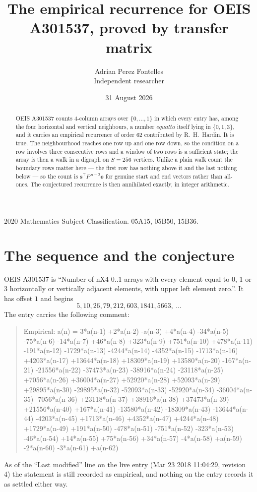 \documentclass[11pt,a4paper]{article}
\title{The empirical recurrence for OEIS A301537, proved by transfer matrix}
\author{Adrian Perez Fontelles\\ \small Independent researcher}
\date{31 August 2026}
\theoremstyle{plain}
\theoremstyle{definition}
\begin{document}
\maketitle

\begin{abstract}
OEIS A301537 counts $4$-column arrays over $\{0,\dots,1\}$ in which every entry has,
among the four horizontal and vertical neighbours, a number $equal to$ itself lying in $\{0,1,3\}$, and it carries an empirical
recurrence of order $62$ contributed by R.~H.~Hardin. It is true. The neighbourhood
reaches one row up and one row down, so the condition on a row involves three consecutive
rows and a window of two rows is a sufficient state; the array is then a walk in a digraph
on $S=256$ vertices. Unlike a plain walk count the boundary rows matter here --- the first
row has nothing above it and the last nothing below --- so the count is
$\mathbf{s}^{\!\top}P^{\,n-2}\mathbf{e}$ for genuine start and end vectors rather than
all-ones. The conjectured recurrence is then annihilated exactly, in integer arithmetic.
\end{abstract}

\noindent\small 2020 Mathematics Subject Classification. 05A15, 05B50, 15B36.\normalsize

\section{The sequence and the conjecture}

OEIS A301537 is ``Number of nX4 0..1 arrays with every element equal to 0, 1 or 3 horizontally or vertically adjacent elements, with upper left element zero.''. It has offset
$1$ and begins
\[
5, 10, 26, 79, 212, 603, 1841, 5663,\ \dots
\]
The entry carries the following comment:
\begin{quote}\small
Empirical: a(n) = 3*a(n-1) +2*a(n-2) -a(n-3) +4*a(n-4) -34*a(n-5) -75*a(n-6) -14*a(n-7) +46*a(n-8) +323*a(n-9) +751*a(n-10) +478*a(n-11) -191*a(n-12) -1729*a(n-13) -4244*a(n-14) -4352*a(n-15) -1713*a(n-16) +4203*a(n-17) +13644*a(n-18) +18309*a(n-19) +13580*a(n-20) -167*a(n-21) -21556*a(n-22) -37473*a(n-23) -38916*a(n-24) -23118*a(n-25) +7056*a(n-26) +36004*a(n-27) +52920*a(n-28) +52093*a(n-29) +29895*a(n-30) -29895*a(n-32) -52093*a(n-33) -52920*a(n-34) -36004*a(n-35) -7056*a(n-36) +23118*a(n-37) +38916*a(n-38) +37473*a(n-39) +21556*a(n-40) +167*a(n-41) -13580*a(n-42) -18309*a(n-43) -13644*a(n-44) -4203*a(n-45) +1713*a(n-46) +4352*a(n-47) +4244*a(n-48) +1729*a(n-49) +191*a(n-50) -478*a(n-51) -751*a(n-52) -323*a(n-53) -46*a(n-54) +14*a(n-55) +75*a(n-56) +34*a(n-57) -4*a(n-58) +a(n-59) -2*a(n-60) -3*a(n-61) +a(n-62)
\end{quote}
As of the ``Last modified'' line on the live entry (Mar 23 2018 11:04:29, revision
4) the statement is still recorded as empirical, and nothing on the entry
records it as settled either way.
\end{document}
